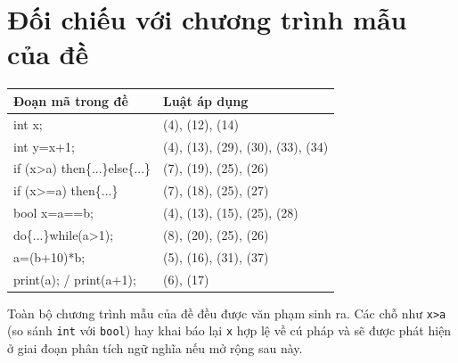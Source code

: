 \documentclass[11pt,a4paper]{article}
\newcommand{\tm}[1]{\texttt{\textcolor{upltok}{#1}}}
\newcommand{\rn}[1]{(#1)}
\begin{document}
\section{Đối chiếu với chương trình mẫu của đề}

\begin{table}[h]
\centering
\begin{tabularx}{\linewidth}{@{}>{\ttfamily\raggedright\arraybackslash}p{6.2cm} X@{}}
\toprule
\textrm{\textbf{Đoạn mã trong đề}} & \textbf{Luật áp dụng} \\
\midrule
int x;                       & \rn{4}, \rn{12}, \rn{14} \\
int y=x+1;                   & \rn{4}, \rn{13}, \rn{29}, \rn{30}, \rn{33}, \rn{34} \\
if (x>a) then\{...\}else\{...\} & \rn{7}, \rn{19}, \rn{25}, \rn{26} \\
if (x>=a) then\{...\}        & \rn{7}, \rn{18}, \rn{25}, \rn{27} \\
bool x=a==b;                 & \rn{4}, \rn{13}, \rn{15}, \rn{25}, \rn{28} \\
do\{...\}while(a>1);         & \rn{8}, \rn{20}, \rn{25}, \rn{26} \\
a=(b+10)*b;                  & \rn{5}, \rn{16}, \rn{31}, \rn{37} \\
print(a); / print(a+1);      & \rn{6}, \rn{17} \\
\bottomrule
\end{tabularx}
\end{table}

Toàn bộ chương trình mẫu của đề đều được văn phạm sinh ra. Các chỗ như
\texttt{x>a} (so sánh \tm{int} với \tm{bool}) hay khai báo lại \texttt{x} hợp
lệ về cú pháp và sẽ được phát hiện ở giai đoạn phân tích ngữ nghĩa nếu mở rộng
sau này.
\end{document}

